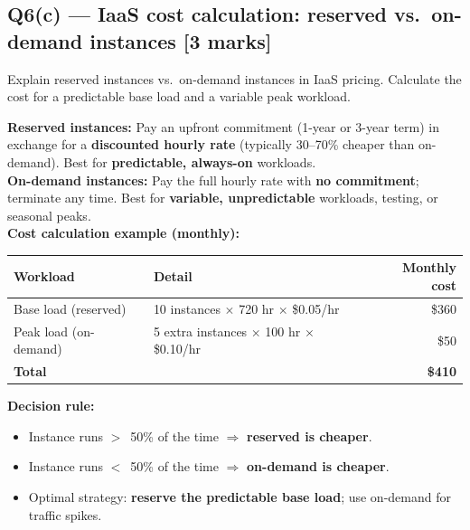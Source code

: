 \documentclass[12pt, a4paper]{article}
\newenvironment{qbox}{\begin{mdframed}[style=qframe]}{\end{mdframed}}
\newenvironment{solbox}{\begin{mdframed}[style=solframe]}{\end{mdframed}}
\newcommand{\qmarks}[1]{\hfill\textbf{\color{orange!70!black}[#1 marks]}}
\begin{document}
\subsection{Q6(c) --- IaaS cost calculation: reserved vs.\ on-demand instances
  \texorpdfstring{\qmarks{3}}{}}
\begin{qbox}Explain reserved instances vs.\ on-demand instances in IaaS pricing. Calculate
the cost for a predictable base load and a variable peak workload.\end{qbox}
\begin{solbox}
\textbf{Reserved instances:} Pay an upfront commitment (1-year or 3-year term) in exchange
for a \textbf{discounted hourly rate} (typically 30--70\% cheaper than on-demand). Best for
\textbf{predictable, always-on} workloads.\\[4pt]

\textbf{On-demand instances:} Pay the full hourly rate with \textbf{no commitment}; terminate
any time. Best for \textbf{variable, unpredictable} workloads, testing, or seasonal
peaks.\\[6pt]

\textbf{Cost calculation example (monthly):}
\begin{center}\renewcommand{\arraystretch}{1.3}
\begin{tabularx}{0.92\linewidth}{l X r}
\toprule
\textbf{Workload} & \textbf{Detail} & \textbf{Monthly cost} \\
\midrule
Base load (reserved)  & 10 instances $\times$ 720 hr $\times$ \$0.05/hr & \$360 \\
Peak load (on-demand) & 5 extra instances $\times$ 100 hr $\times$ \$0.10/hr & \$50 \\
\midrule
\textbf{Total} & & \textbf{\$410} \\
\bottomrule
\end{tabularx}\end{center}

\textbf{Decision rule:}
\begin{itemize}[leftmargin=1.4cm, itemsep=1pt]
  \item Instance runs $>$~50\% of the time $\Rightarrow$ \textbf{reserved is cheaper}.
  \item Instance runs $<$~50\% of the time $\Rightarrow$ \textbf{on-demand is cheaper}.
  \item Optimal strategy: \textbf{reserve the predictable base load}; use on-demand for
    traffic spikes.
\end{itemize}
\end{solbox}
\end{document}

